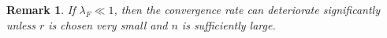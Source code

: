 \documentclass{article}
\newtheorem{remark}{Remark}
\newtheorem{theorem}{Theorem}
\theoremstyle{definition}
\begin{document}


\begin{remark}

If $\lambda_F \ll 1$, then the convergence rate can deteriorate significantly unless $r$ is chosen very small and $n$ is sufficiently large.  
\end{remark}
\end{document}
